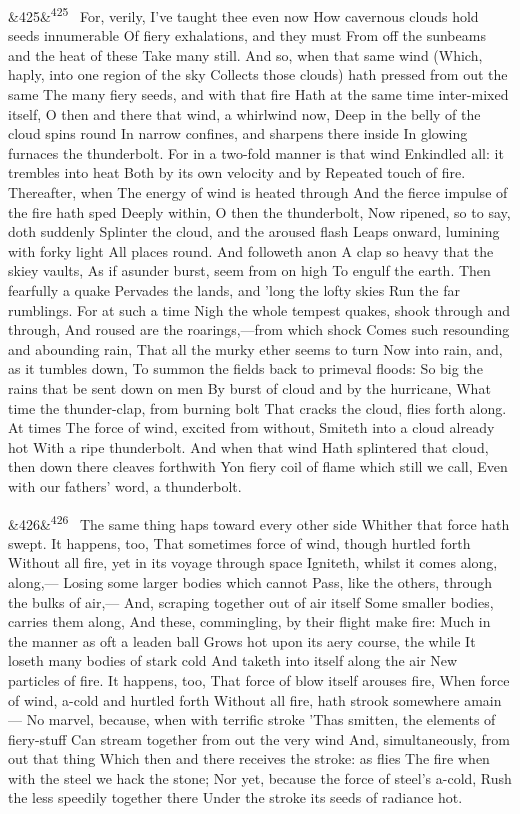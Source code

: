 \documentclass[12pt]{article}
\newcommand{\para}[1][]{\par\noindent\ifx&#1&\else\textsuperscript{\footnotesize #1}~\fi}
\begin{document}
\para[425] For, verily, I've taught thee even now How cavernous clouds hold seeds innumerable Of fiery exhalations, and they must From off the sunbeams and the heat of these Take many still. And so, when that same wind (Which, haply, into one region of the sky Collects those clouds) hath pressed from out the same The many fiery seeds, and with that fire Hath at the same time inter-mixed itself, O then and there that wind, a whirlwind now, Deep in the belly of the cloud spins round In narrow confines, and sharpens there inside In glowing furnaces the thunderbolt. For in a two-fold manner is that wind Enkindled all: it trembles into heat Both by its own velocity and by Repeated touch of fire. Thereafter, when The energy of wind is heated through And the fierce impulse of the fire hath sped Deeply within, O then the thunderbolt, Now ripened, so to say, doth suddenly Splinter the cloud, and the aroused flash Leaps onward, lumining with forky light All places round. And followeth anon A clap so heavy that the skiey vaults, As if asunder burst, seem from on high To engulf the earth. Then fearfully a quake Pervades the lands, and 'long the lofty skies Run the far rumblings. For at such a time Nigh the whole tempest quakes, shook through and through, And roused are the roarings,---from which shock Comes such resounding and abounding rain, That all the murky ether seems to turn Now into rain, and, as it tumbles down, To summon the fields back to primeval floods: So big the rains that be sent down on men By burst of cloud and by the hurricane, What time the thunder-clap, from burning bolt That cracks the cloud, flies forth along. At times The force of wind, excited from without, Smiteth into a cloud already hot With a ripe thunderbolt. And when that wind Hath splintered that cloud, then down there cleaves forthwith Yon fiery coil of flame which still we call, Even with our fathers' word, a thunderbolt.

\para[426] The same thing haps toward every other side Whither that force hath swept. It happens, too, That sometimes force of wind, though hurtled forth Without all fire, yet in its voyage through space Igniteth, whilst it comes along, along,--- Losing some larger bodies which cannot Pass, like the others, through the bulks of air,--- And, scraping together out of air itself Some smaller bodies, carries them along, And these, commingling, by their flight make fire: Much in the manner as oft a leaden ball Grows hot upon its aery course, the while It loseth many bodies of stark cold And taketh into itself along the air New particles of fire. It happens, too, That force of blow itself arouses fire, When force of wind, a-cold and hurtled forth Without all fire, hath strook somewhere amain--- No marvel, because, when with terrific stroke 'Thas smitten, the elements of fiery-stuff Can stream together from out the very wind And, simultaneously, from out that thing Which then and there receives the stroke: as flies The fire when with the steel we hack the stone; Nor yet, because the force of steel's a-cold, Rush the less speedily together there Under the stroke its seeds of radiance hot.
\end{document}
